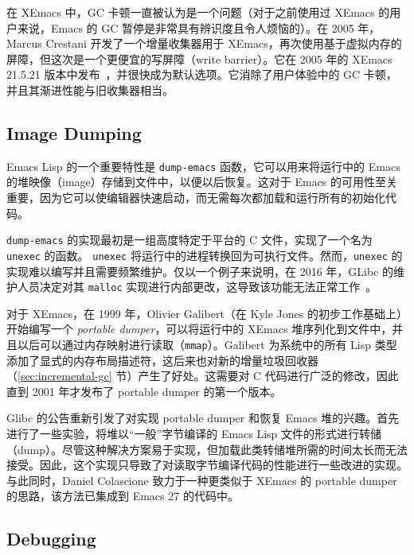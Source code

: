 \documentclass[format=acmsmall,screen]{acmart}
\begin{document}
\label{sec:incremental-gc}

在 XEmacs 中，GC 卡顿一直被认为是一个问题（对于之前使用过 XEmacs 的用户来说，Emacs 的 GC 暂停是非常具有辨识度且令人烦恼的）。在 2005 年，Marcus Crestani 开发了一个增量收集器用于 XEmacs，再次使用基于虚拟内存的屏障，但这次是一个更便宜的写屏障（write barrier）。它在 2005 年的 XEmacs 21.5.21 版本中发布~\cite{Crestani2005}，并很快成为默认选项。它消除了用户体验中的 GC 卡顿，并且其渐进性能与旧收集器相当。

\subsection{Image Dumping}
\label{sec:image-dumping}

Emacs Lisp 的一个重要特性是 \texttt{dump-emacs} 函数，它可以用来将运行中的 Emacs 的堆映像（image）存储到文件中，以便以后恢复。这对于 Emacs 的可用性至关重要，因为它可以使编辑器快速启动，而无需每次都加载和运行所有的初始化代码。

\texttt{dump-emacs} 的实现最初是一组高度特定于平台的 C 文件，实现了一个名为 \texttt{unexec} 的函数。 \texttt{unexec} 将运行中的进程转换回为可执行文件。然而，\texttt{unexec} 的实现难以编写并且需要频繁维护。仅以一个例子来说明，在 2016 年，GLibc 的维护人员决定对其 \texttt{malloc} 实现进行内部更改，这导致该功能无法正常工作~\cite{UnexecGlibc}。

对于 XEmacs，在 1999 年，Olivier Galibert（在 Kyle Jones 的初步工作基础上）开始编写一个 \emph{portable dumper}，可以将运行中的 XEmacs 堆序列化到文件中，并且以后可以通过内存映射进行读取（\texttt{mmap}）。Galibert 为系统中的所有 Lisp 类型添加了显式的内存布局描述符，这后来也对新的增量垃圾回收器（\ref{sec:incremental-gc} 节）产生了好处。这需要对 C 代码进行广泛的修改，因此直到 2001 年才发布了 portable dumper 的第一个版本。

Glibc 的公告重新引发了对实现 portable dumper 和恢复 Emacs 堆的兴趣。首先进行了一些实验，将堆以“一般”字节编译的 Emacs Lisp 文件的形式进行转储（dump）。尽管这种解决方案易于实现，但加载此类转储堆所需的时间太长而无法接受。因此，这个实现只导致了对读取字节编译代码的性能进行一些改进的实现。与此同时，Daniel Colascione 致力于一种更类似于 XEmacs 的 portable dumper 的思路，该方法已集成到 Emacs 27 的代码中。

\subsection{Debugging}
\label{sec:debugger}
\end{document}

